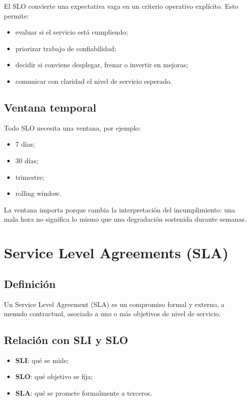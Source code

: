 \documentclass[variant=apuntes,cover=institutional,mode=screen]{ua-engineering-v6-article}
\begin{document}
El SLO convierte una expectativa vaga en un criterio operativo explícito. Esto permite:
\begin{itemize}
\item evaluar si el servicio está cumpliendo;
\item priorizar trabajo de confiabilidad;
\item decidir si conviene desplegar, frenar o invertir en mejoras;
\item comunicar con claridad el nivel de servicio esperado.
\end{itemize}

\subsection{Ventana temporal}

Todo SLO necesita una ventana, por ejemplo:
\begin{itemize}
\item 7 días;
\item 30 días;
\item trimestre;
\item rolling window.
\end{itemize}

La ventana importa porque cambia la interpretación del incumplimiento: una mala hora no significa lo mismo que una degradación sostenida durante semanas.

\section{Service Level Agreements (SLA)}

\subsection{Definición}

Un Service Level Agreement (SLA) es un compromiso formal y externo, a menudo contractual, asociado a uno o más objetivos de nivel de servicio.

\subsection{Relación con SLI y SLO}

\begin{itemize}
\item \textbf{SLI}: qué se mide;
\item \textbf{SLO}: qué objetivo se fija;
\item \textbf{SLA}: qué se promete formalmente a terceros.
\end{itemize}
\end{document}
